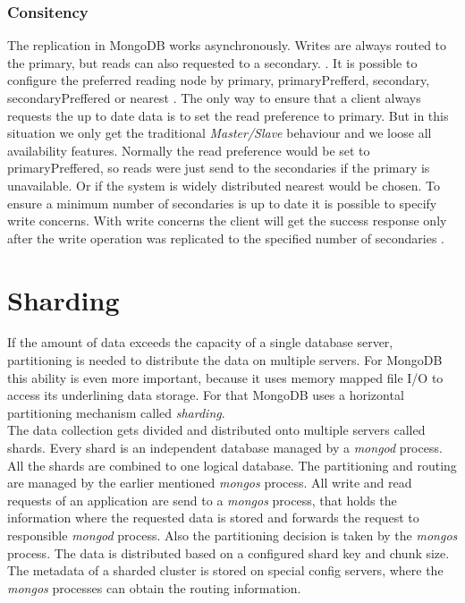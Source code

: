 \subsubsection{Consitency}
The replication in MongoDB works asynchronously. Writes are always routed to the primary, but reads can also requested to a secondary. . It is possible to configure the preferred reading node by primary, primaryPrefferd, secondary, secondaryPreffered or nearest \cite{theguide}. The only way to ensure that a client always requests the up to date data is to set the read preference to primary. But in this situation we only get the traditional \textit{Master/Slave} behaviour and we loose all availability features. Normally the read preference would be set to primaryPreffered, so reads were just send to the secondaries if the primary is unavailable. Or if the system is widely distributed nearest would be chosen.
To ensure a minimum number of secondaries is up to date it is possible to specify write concerns. With write concerns the client will get the success response only after the write operation was replicated to the specified number of secondaries \cite{pracmong}.

\section{Sharding}
If the amount of data exceeds the capacity of a single database server, partitioning is needed to distribute the data on multiple servers. For MongoDB this ability is even more important, because it uses memory mapped file I/O to access its underlining data storage\cite{theguide}. For that MongoDB uses a horizontal partitioning mechanism called \textit{sharding}.\\
The data collection gets divided and distributed onto multiple servers called shards. Every shard is an independent database managed by a \textit{mongod} process. All the shards are combined to one logical database. The partitioning and routing are managed by the earlier mentioned \textit{mongos} process. All write and read requests of an application are send to a \textit{mongos} process, that holds the information where the requested data is stored and forwards the request to responsible \textit{mongod} process. Also the partitioning decision is taken by the \textit{mongos} process. The data is distributed based on a configured shard key and chunk size. The metadata of a sharded cluster is stored on special config servers, where the \textit{mongos} processes can obtain the routing information.

